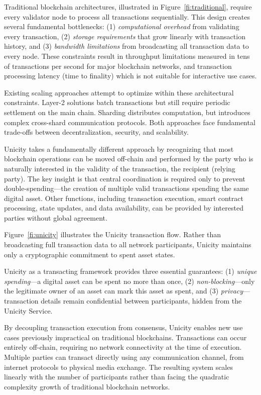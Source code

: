 \documentclass{article}
\begin{document}
Traditional blockchain architectures, illustrated in Figure~\ref{fi:traditional}, require every validator node to process all transactions sequentially. This design creates several fundamental bottlenecks: (1) \emph{computational overhead} from validating every transaction, (2) \emph{storage requirements} that grow linearly with transaction history, and (3) \emph{bandwidth limitations} from broadcasting all transaction data to every node. These constraints result in throughput limitations measured in tens of transactions per second for major blockchain networks, and transaction processing latency (time to finality) which is not suitable for interactive use cases.

Existing scaling approaches attempt to optimize within these architectural constraints. Layer-2 solutions batch transactions but still require periodic settlement on the main chain. Sharding distributes computation, but introduces complex cross-shard communication protocols. Both approaches face fundamental trade-offs between decentralization, security, and scalability.

Unicity takes a fundamentally different approach by recognizing that most blockchain operations can be moved off-chain and performed by the party who is naturally interested in the validity of the transaction, the recipient (relying party). The key insight is that central coordination is required only to prevent double-spending---the creation of multiple valid transactions spending the same digital asset. Other functions, including transaction execution, smart contract processing, state updates, and data availability, can be provided by interested parties without global agreement.

Figure~\ref{fi:unicity} illustrates the Unicity transaction flow. Rather than broadcasting full transaction data to all network participants, Unicity maintains only a cryptographic commitment to spent asset states.

Unicity as a transacting framework provides three essential guarantees: (1) \emph{unique spending}—a digital asset can be spent no more than once, (2) \emph{non-blocking}—only the legitimate owner of an asset can mark this asset as spent, and (3) \emph{privacy}—transaction details remain confidential between participants, hidden from the Unicity Service.

By decoupling transaction execution from consensus, Unicity enables new use cases previously impractical on traditional blockchains. Transactions can occur entirely off-chain, requiring no network connectivity at the time of execution. Multiple parties can transact directly using any communication channel, from internet protocols to physical media exchange. The resulting system scales linearly with the number of participants rather than facing the quadratic complexity growth of traditional blockchain networks.
\end{document}
